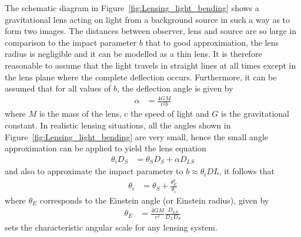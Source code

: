 		The schematic diagram in Figure~\ref{fig:Lensing_light_bending} shows a gravitational lens acting on light from a background source in such a way as to form two images. The distances between observer, lens and source are so large in comparison to the impact parameter $b$ that to good approximation, the lens radius is negligible and it can be modelled as a thin lens. It is therefore reasonable to assume that the light travels in straight lines at all times except in the lens plane where the complete deflection occurs. Furthermore, it can be assumed that for all values of $b$, the deflection angle is given by
		\begin{align}
			\alpha &= \frac{4GM}{c^2 b}
		\end{align}
		where $M$ is the mass of the lens, c the speed of light and $G$ is the gravitational constant. In realistic lensing situations, all the angles shown in Figure~\ref{fig:Lensing_light_bending} are very small, hence the small angle approximation can be applied to yield the lens equation
		\begin{align}
			\theta_i D_S &= \theta_S D_S + \alpha D_{LS}
		\end{align}
		and also to approximate the impact parameter to $b\approx\theta_i DL$, it follows that
		\begin{align}
			\theta_i &= \theta_S + \frac{\theta_E^2}{\theta_i} \label{eq:einstein_angle}
		\end{align}
		where $\theta_E$ corresponds to the Einstein angle (or Einstein radius), given by
		\begin{align}
			\theta_E &= \frac{4GM}{c^2}\frac{D_{LS}}{D_L D_S}
		\end{align}
		sets the characteristic angular scale for any lensing system\cite{Hartle}.

